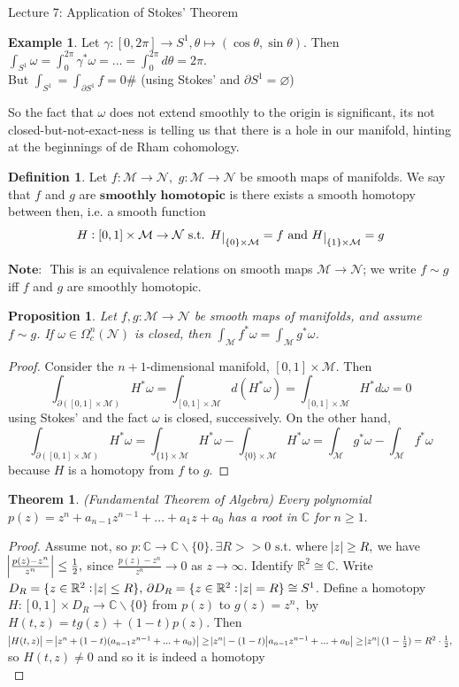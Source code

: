 \documentclass[10pt]{article}
\theoremstyle{plain}
\newtheorem{theorem}{Theorem}[section]
\newtheorem{prop}[thm]{Proposition}
\theoremstyle{definition}
\newtheorem{defn}[thm]{Definition} %
\newtheorem{exmp}[thm]{Example} %
\newcommand{\myand}{\text{ and }}
\newcommand{\st}{\text{ s.t. }}
\newcommand{\Note}{\textbf{Note: }}
\newcommand{\Real}{\mathbb{R}}
\newcommand{\man}{\mathcal{M}}
\newcommand{\nan}{\mathcal{N}}
\newcommand{\compactpformnan}[1]{\Omega^{#1}_c(\nan)}
\newcommand{\deriv}{d}
\newcommand{\dw}{d\omega}
\def\restrict#1{\raise-.5ex\hbox{\ensuremath|}_{#1}}
\begin{document}
\begin{section}{Lecture 7: Application of Stokes' Theorem}
\begin{exmp}
Let $\gamma : [0,2\pi] \to S^1, \theta \mapsto (\cos\theta,\sin\theta).$ Then $\int_{S^1} \omega = \int_0^{2\pi} \gamma^* \omega = ... = \int_0 ^{2\pi} \deriv \theta = 2\pi.$\\
But $\int_{S^1} = \int_{\partial S^1} f = 0 \#$ (using Stokes' and $\partial S^1 = \varnothing$)
\end{exmp}
So the fact that $\omega$ does not extend smoothly to the origin is significant, its not closed-but-not-exact-ness is telling us that there is a hole in our manifold, hinting at the beginnings of de Rham cohomology.
\begin{defn}
Let $f : \man \to \nan,$ $g:\man \to \nan$ be smooth maps of manifolds. We say that $f$ and $g$ are $\textbf{smoothly homotopic}$ is there exists a smooth homotopy between then, i.e. a smooth function 
$$H: [0,1] \times \man \to \nan \st H\restrict{\{0\} \times \man} = f \myand H\restrict{\{1\} \times\man} = g$$
\end{defn}
$\Note$ This is an equivalence relations on smooth maps $\man \to \nan$; we write $f \sim g$ iff $f$ and $g$ are smoothly homotopic.
\begin{prop}\label{prop:HomotopyInvarianceOfIntegral}
Let $f,g : \man \to \nan$ be smooth maps of manifolds, and assume $f\sim g$. If $\omega \in \compactpformnan{n}$ is closed, then $\int_\man f ^* \omega = \int_\man g^* \omega$.
\end{prop}
\begin{proof}
Consider the $n+1$-dimensional manifold, $[0,1]\times \man$. Then 
$$\int_{\partial ([0,1]\times \man)} H^*\omega = \int_{[0,1]\times \man} \deriv ( H^* \omega) = \int_{[0,1]\times\man} H^*\dw = 0$$
using Stokes' and the fact $\omega$ is closed, successively. On the other hand,
$$\int_{\partial ([0,1]\times \man)} H^* \omega = \int_{\{1\}\times \man} H^*\omega - \int_{\{0\}\times \man} H^*\omega = \int_\man g^*\omega - \int_\man f^* \omega$$
because $H$ is a homotopy from $f$ to $g$.
\end{proof}
\begin{theorem}
(Fundamental Theorem of Algebra) Every polynomial $p(z) = z^n + a_{n-1}z^{n-1} + ... + a_1 z + a_0$ has a root in $\mathbb{C}$ for $n \geq 1.$
\end{theorem}
\begin{proof}
Assume not, so $p: \mathbb{C} \to \mathbb{C}\backslash \{0\}.\, \exists R > > 0 \st$where $\abs{z} \geq R,$ we have $\abs{\frac{p(z)-z^n}{z^n}}\leq \frac{1}{2},$ since $\frac{p(z) - z^n}{z^n} \to 0$ as $z\to \infty.$ Identify $\Real^2 \cong \mathbb{C}$. Write $D_R = \{z\in \Real^2 : \abs{z} \leq R\},\, \partial D_R = \{z\in \Real^2 : \abs{z} = R\}\cong S^1$. Define a homotopy $H : [0,1] \times D_R \to \mathbb{C}\backslash\{0\}$ from $p(z)$ to $g(z) = z^n,$ by $H(t,z) = tg(z) + (1-t)p(z).$ Then $\abs{H(t,z)} = \abs{z^n +(1-t)(a_{n-1}z^{n-1} +...+a_0)}\geq \abs{z^n} -(1-t)\abs{a_{n-1}z^{n-1} + ... + a_0} \geq \abs{z^n}(1-\frac{1}{2}) = R^2 \cdot \frac{1}{2},$ so $H(t,z) \neq 0$ and so it is indeed a homotopy\\

\end{proof}
\end{section}
\end{document}
